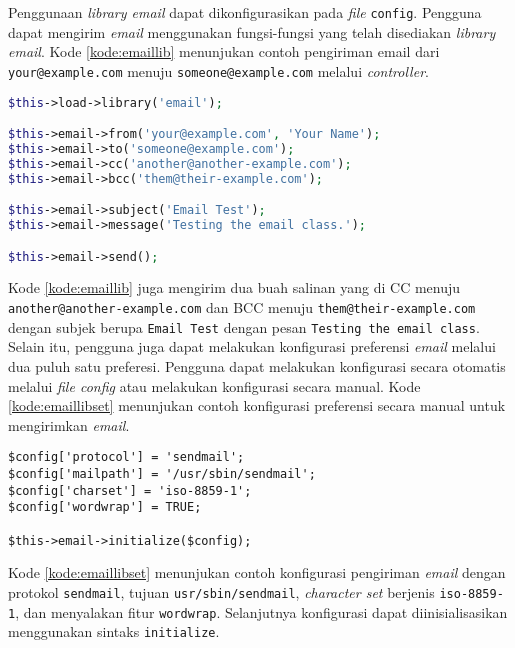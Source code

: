 Penggunaan \textit{library email} dapat dikonfigurasikan pada \textit{file} \texttt{config}. Pengguna dapat mengirim \textit{email} menggunakan fungsi-fungsi yang telah disediakan \textit{library email}. Kode \ref{kode:emaillib} menunjukan contoh pengiriman email dari \texttt{your@example.com} menuju \texttt{someone@example.com} melalui \textit{controller}.

\begin{lstlisting}[language=PHP, caption=Contoh pengiriman email melalui \textit{controller}, label=kode:emaillib]
$this->load->library('email');

$this->email->from('your@example.com', 'Your Name');
$this->email->to('someone@example.com');
$this->email->cc('another@another-example.com');
$this->email->bcc('them@their-example.com');

$this->email->subject('Email Test');
$this->email->message('Testing the email class.');

$this->email->send();
\end{lstlisting}

Kode \ref{kode:emaillib} juga mengirim dua buah salinan yang di CC menuju \texttt{another@another-example.com} dan BCC menuju \texttt{them@their-example.com} dengan subjek berupa \texttt{Email Test} dengan pesan \texttt{Testing the email class}. Selain itu, pengguna juga dapat melakukan konfigurasi preferensi \textit{email} melalui dua puluh satu preferesi. Pengguna dapat melakukan konfigurasi secara otomatis melalui \textit{file config} atau melakukan konfigurasi secara manual. Kode \ref{kode:emaillibset} menunjukan contoh konfigurasi preferensi secara manual untuk mengirimkan \textit{email}.

\begin{lstlisting}[caption=Contoh konfigurasi preferensi \textit{library email} secara manual, label=kode:emaillibset]
$config['protocol'] = 'sendmail';
$config['mailpath'] = '/usr/sbin/sendmail';
$config['charset'] = 'iso-8859-1';
$config['wordwrap'] = TRUE;

$this->email->initialize($config);
\end{lstlisting}
Kode \ref{kode:emaillibset} menunjukan contoh konfigurasi pengiriman \textit{email} dengan protokol \texttt{sendmail}, tujuan \texttt{usr/sbin/sendmail}, \textit{character set} berjenis \texttt{iso-8859-1}, dan menyalakan fitur \texttt{wordwrap}. Selanjutnya konfigurasi dapat diinisialisasikan menggunakan sintaks \texttt{initialize}.

